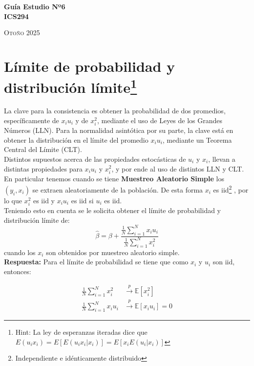 \documentclass{exam}
\begin{document}
\begin{center}


\LARGE{\textbf{Guía Estudio Nº6}}\\
\LARGE{\textbf{ICS294}}\\
\bigskip
\bigskip


\normalsize{\textsc{Otoño 2025}}

\end{center}

\section{Límite de probabilidad y distribución límite\footnote{Hint: La ley de esperanzas iteradas dice que $E(u_ix_i) = E[E(u_ix_i|x_i)] = E[x_i E(u_i|x_i)]$}} La clave para la consistencia es obtener la probabilidad de dos promedios, espec\'ificamente de $x_i u_i$ y de $x_i^2$, mediante el uso de Leyes de los Grandes N\'umeros (LLN). Para la normalidad asint\'otica por su parte, la clave est\'a en obtener la distribuci\'on en el l\'imite del promedio $x_i u_i$, mediante un Teorema Central del L\'imite (CLT).\\

Distintos supuestos acerca de las propiedades estoc\'asticas de $u_i$ y $x_i$, llevan a distintas propiedades para $x_i u_i$ y $x_i^2$, y por ende al uso de distintos LLN y CLT. En particular tenemos cuando se tiene \textbf{Muestreo Aleatorio Simple} los $(y_i , x_i)$ se extraen aleatoriamente de la poblaci\'on. De esta forma $x_i$ es iid\footnote{Independiente e idénticamente distribuido} , por lo que $x_i^2$ es iid y $x_i u_i$ es iid si $u_i$ es iid.\\

Teniendo esto en cuenta se le solicita obtener el límite de probabilidad y distribución límite de:
    \[\hat{\beta} = \beta + \frac{\frac{1}{N} \sum_{i=1}^{N} x_i u_i}{\frac{1}{N} \sum_{i=1}^{N} x_i^2}\]
cuando los $x_i$ son obtenidos por muestreo aleatorio simple.\\

\textbf{Respuesta:}
    Para el límite de probabilidad se tiene que como $x_i$ y $u_i$ son iid, entonces:
    
    \begin{align*}
    \frac{1}{N} \sum_{i=1}^N x_i^2 &\xrightarrow{p} \mathbb{E}[x_i^2] \\
    \frac{1}{N} \sum_{i=1}^N x_i u_i &\xrightarrow{p} \mathbb{E}[x_i u_i] = 0
    \end{align*}
    
\end{document}
